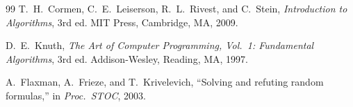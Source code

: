\documentclass[12pt]{article}
\begin{document}
\begin{thebibliography}{99}
T.~H.\ Cormen, C.~E.\ Leiserson, R.~L.\ Rivest, and C.~Stein,
\textit{Introduction to Algorithms}, 3rd ed.
MIT Press, Cambridge, MA, 2009.

D.~E.\ Knuth,
\textit{The Art of Computer Programming, Vol.\ 1: Fundamental Algorithms},
3rd ed.
Addison-Wesley, Reading, MA, 1997.

A.~Flaxman, A.~Frieze, and T.~Krivelevich,
``Solving and refuting random formulas,''
in \textit{Proc.\ STOC}, 2003.

\end{thebibliography}
\end{document}
